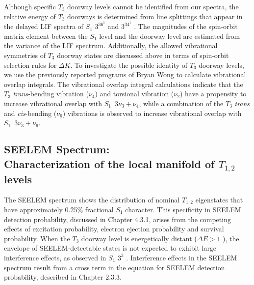 \documentclass[12pt]{mitthesis}
\begin{document}
Although specific $T_3$ doorway levels cannot be identified from our
spectra, the relative energy of $T_3$ doorways is determined from line
splittings that appear in the delayed LIF spectra of $S_1$ $3^36^1$
 and $3^34^1$ .  The magnitudes of the spin-orbit matrix
element between the $S_1$ level and the doorway level are estimated
from the variance of the LIF spectrum.  Additionally, the allowed
vibrational symmetries of $T_3$ doorway states are discussed above in
terms of spin-orbit selection rules for $\Delta K$.  To investigate
the possible identity of $T_3$ doorway levels, we use the previously
reported programs of Bryan Wong to calculate vibrational overlap
integrals.  The vibrational overlap integral calculations indicate
that the $T_3$ \emph{trans}-bending vibration ($\nu_4$) and torsional
vibration ($\nu_2$) have a propensity to increase vibrational overlap
with $S_1 \:\; 3\nu_3 + \nu_4$, while a combination of the $T_3$
\emph{trans} and \emph{cis}-bending ($\nu_6$) vibrations is observed
to increase vibrational overlap with $S_1 \:\; 3\nu_3 + \nu_6$.

























\subsection{SEELEM Spectrum: \\Characterization of the local manifold of
  $T_{1,2}$ levels}

The SEELEM spectrum shows the distribution of nominal $T_{1,2}$
eigenstates that have approximately 0.25\% fractional $S_1$ character.
This specificity in SEELEM detection probability, discussed in Chapter
4.3.1, arises from the competing effects of excitation probability,
electron ejection probability and survival probability.  When the
$T_3$ doorway level is energetically distant ($\Delta E > 1$ \rcm),
the envelope of SEELEM-detectable states is not expected to exhibit
large interference effects, as observed in $S_1$ $3^3$ .
Interference effects in the SEELEM spectrum result from a cross term
in the equation for SEELEM detection probability, described in Chapter
2.3.3.
\end{document}
